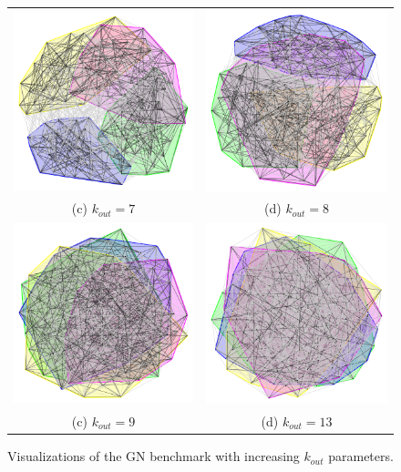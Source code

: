 \begin{figure}
\begin{tabular}{cc}
		\includegraphics[width=65mm]{images/girvan_kout_7_0.png} &   \includegraphics[width=65mm]{images/girvan_kout_8_0.png} \\
		(c) $k_{out}=7$ & (d) $k_{out}=8$ \\[6pt]
		\includegraphics[width=65mm]{images/girvan_kout_9_0.png} &   \includegraphics[width=65mm]{images/girvan_kout_13_0.png} \\
		(c) $k_{out}=9$ & (d) $k_{out}=13$ \\[6pt]
		
	\end{tabular}
	\caption{Visualizations of the GN benchmark with increasing $k_{out}$ parameters.}
\end{figure}


